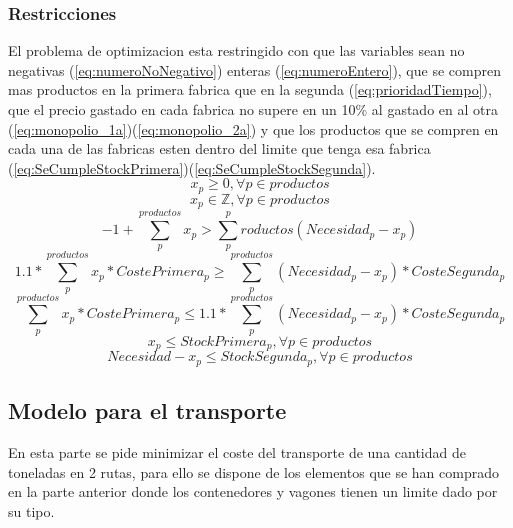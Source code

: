 \documentclass[11pt,spanish]{article}
\begin{document}
			\subsubsection{Restricciones}
			El problema de optimizacion esta restringido con que las variables sean no negativas (\ref{eq:numeroNoNegativo}) enteras (\ref{eq:numeroEntero}), que se compren mas productos en la primera fabrica que en la segunda (\ref{eq:prioridadTiempo}), que el precio gastado en cada fabrica no supere en un 10\% al gastado en al otra (\ref{eq:monopolio_1a})(\ref{eq:monopolio_2a}) y que los productos que se compren en cada una de las fabricas esten dentro del limite que tenga esa fabrica (\ref{eq:SeCumpleStockPrimera})(\ref{eq:SeCumpleStockSegunda}).
			\begin{equation}
				\label{eq:numeroNoNegativo}
				x_p \geq 0, \forall p \in productos
			\end{equation}
			\begin{equation}
				\label{eq:numeroEntero}
				x_p \in \mathbb{Z} , \forall p \in productos
			\end{equation}
			\begin{equation}
				\label{eq:prioridadTiempo}
				-1 + \sum_p^{productos} x_p > \sum_p^productos (Necesidad_p - x_p)
			\end{equation}
			\begin{equation}
				\label{eq:monopolio_1a}
				1.1*\sum_p^{productos} x_p*CostePrimera_p \geq \sum_p^{productos} (Necesidad_p - x_p)*CosteSegunda_p
			\end{equation}
			\begin{equation}
				\label{eq:monopolio_2a}
				\sum_p^{productos} x_p*CostePrimera_p \leq 1.1*\sum_p^{productos} (Necesidad_p - x_p)*CosteSegunda_p
			\end{equation}
			\begin{equation}
				\label{eq:SeCumpleStockPrimera}
				x_p \leq StockPrimera_p, \forall p \in productos
			\end{equation}
			\begin{equation}
				\label{eq:SeCumpleStockSegunda}
				Necesidad - x_p \leq StockSegunda_p, \forall p \in productos
			\end{equation}
		\subsection{Modelo para el transporte}
		En esta parte se pide minimizar el coste del transporte de una cantidad de toneladas en 2 rutas, para ello se dispone de los elementos que se han comprado en la parte anterior donde los contenedores y vagones tienen un limite dado por su tipo.
\end{document}
